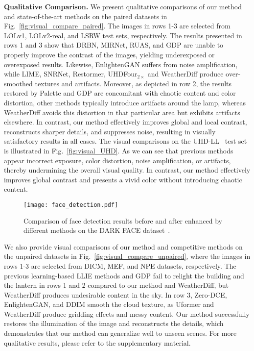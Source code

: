\textbf{Qualitative Comparison.}
We present qualitative comparisons of our method and state-of-the-art methods on the paired datasets in Fig.~\ref{fig:visual_compare_paired}. The images in rows 1-3 are selected from LOLv1, LOLv2-real, and LSRW test sets, respectively. The results presented in rows 1 and 3 show that DRBN, MIRNet, RUAS, and GDP are unable to properly improve the contrast of the images, yielding underexposed or overexposed results. Likewise, EnlightenGAN suffers from noise amplification, while LIME, SNRNet, Restormer, UHDFour$_{2\times}$ and WeatherDiff produce over-smoothed textures and artifacts. Moreover, as depicted in row 2, the results restored by Palette and GDP are concomitant with chaotic content and color distortion, other methods typically introduce artifacts around the lamp, whereas WeatherDiff avoids this distortion in that particular area but exhibits artifacts elsewhere. In contrast, our method effectively improves global and local contrast, reconstructs sharper details, and suppresses noise, resulting in visually satisfactory results in all cases. The visual comparisons on the UHD-LL~\cite{UHD_ICLR} test set is illustrated in Fig.~\ref{fig:visual_UHD}. As we can see that previous methods appear incorrect exposure, color distortion, noise amplification, or artifacts, thereby undermining the overall visual quality. In contrast, our method effectively improves global contrast and presents a vivid color without introducing chaotic content.
\begin{figure*}[!t]
	\centering
	\texttt{[image: face\_detection.pdf]}
	\caption{Comparison of face detection results before and after enhanced by different methods on the DARK FACE dataset~\cite{DarkFace}.}
	\label{fig:face_detection}
\end{figure*}

We also provide visual comparisons of our method and competitive methods on the unpaired datasets in Fig.~\ref{fig:visual_compare_unpaired}, where the images in rows 1-3 are selected from DICM, MEF, and NPE datasets, respectively. The previous learning-based LLIE methods and GDP fail to relight the building and the lantern in rows 1 and 2 compared to our method and WeatherDiff, but WeatherDiff produces undesirable content in the sky. In row 3, Zero-DCE, EnlightenGAN, and DDIM smooth the cloud texture, as Uformer and WeatherDiff produce gridding effects and messy content. Our method successfully restores the illumination of the image and reconstructs the details, which demonstrates that our method can generalize well to unseen scenes. For more qualitative results, please refer to the supplementary material.

